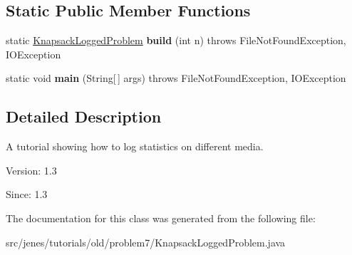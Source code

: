 \subsection*{Static Public Member Functions}
\begin{CompactItemize}
\item 
\hypertarget{classjenes_1_1tutorials_1_1old_1_1problem7_1_1_knapsack_logged_problem_978e0862b0d51bed33093b0739bdf3ef}{
static \hyperlink{classjenes_1_1tutorials_1_1old_1_1problem7_1_1_knapsack_logged_problem}{KnapsackLoggedProblem} \textbf{build} (int n)  throws FileNotFoundException, IOException }
\label{classjenes_1_1tutorials_1_1old_1_1problem7_1_1_knapsack_logged_problem_978e0862b0d51bed33093b0739bdf3ef}

\item 
\hypertarget{classjenes_1_1tutorials_1_1old_1_1problem7_1_1_knapsack_logged_problem_6c304e5e2b49231b6868e15b87b406da}{
static void \textbf{main} (String\mbox{[}$\,$\mbox{]} args)  throws FileNotFoundException, IOException }
\label{classjenes_1_1tutorials_1_1old_1_1problem7_1_1_knapsack_logged_problem_6c304e5e2b49231b6868e15b87b406da}

\end{CompactItemize}


\subsection{Detailed Description}
A tutorial showing how to log statistics on different media.

\begin{Desc}
\item[Version:]1.3\end{Desc}
\begin{Desc}
\item[Since:]1.3 \end{Desc}


The documentation for this class was generated from the following file:\begin{CompactItemize}
\item 
src/jenes/tutorials/old/problem7/KnapsackLoggedProblem.java\end{CompactItemize}
